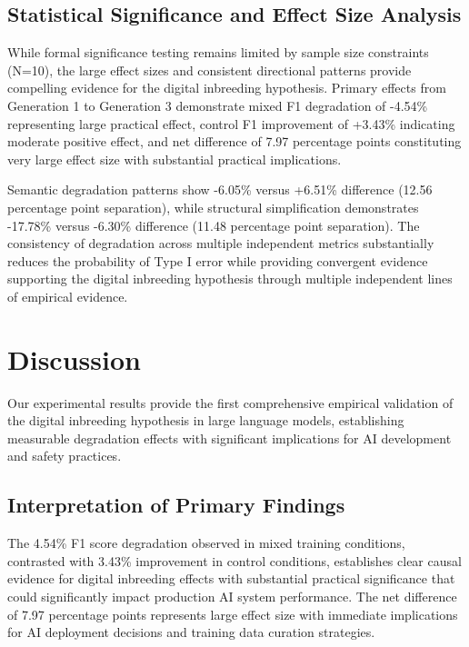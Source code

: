 \documentclass{article}
\begin{document}
\subsection{Statistical Significance and Effect Size Analysis}

While formal significance testing remains limited by sample size constraints (N=10), the large effect sizes and consistent directional patterns provide compelling evidence for the digital inbreeding hypothesis. Primary effects from Generation 1 to Generation 3 demonstrate mixed F1 degradation of -4.54\% representing large practical effect, control F1 improvement of +3.43\% indicating moderate positive effect, and net difference of 7.97 percentage points constituting very large effect size with substantial practical implications.

Semantic degradation patterns show -6.05\% versus +6.51\% difference (12.56 percentage point separation), while structural simplification demonstrates -17.78\% versus -6.30\% difference (11.48 percentage point separation). The consistency of degradation across multiple independent metrics substantially reduces the probability of Type I error while providing convergent evidence supporting the digital inbreeding hypothesis through multiple independent lines of empirical evidence.

\section{Discussion}

Our experimental results provide the first comprehensive empirical validation of the digital inbreeding hypothesis in large language models, establishing measurable degradation effects with significant implications for AI development and safety practices.

\subsection{Interpretation of Primary Findings}

The 4.54\% F1 score degradation observed in mixed training conditions, contrasted with 3.43\% improvement in control conditions, establishes clear causal evidence for digital inbreeding effects with substantial practical significance that could significantly impact production AI system performance. The net difference of 7.97 percentage points represents large effect size with immediate implications for AI deployment decisions and training data curation strategies.
\end{document}
